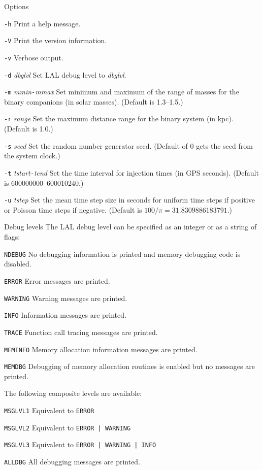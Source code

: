 \begin{entry}
\item[Options]\leavevmode
\begin{entry}
\item[\texttt{-h}]
Print a help message.
\item[\texttt{-V}]
Print the version information.
\item[\texttt{-v}]
Verbose output.
\item[\texttt{-d} \textit{dbglvl}]
Set LAL debug level to \textit{dbglvl}.
\item[\texttt{-m} \textit{mmin}\texttt{-}\textit{mmax}]
Set minimum and maximum of the range of masses  for the  binary companions (in
solar masses).  (Default is 1.3--1.5.)
\item[\texttt{-r} \textit{range}]
Set the maximum distance range for the binary system (in kpc).  (Default is
1.0.)
\item[\texttt{-s} \textit{seed}]
Set  the random number generator seed.  (Default of 0 gets the seed from the
system clock.)
\item[\texttt{-t} \textit{tstart}\texttt{-}\textit{tend}]
Set the time interval for injection times  (in  GPS seconds).  (Default is
600000000--600010240.)
\item[\texttt{-u} \textit{tstep}]
Set  the mean time step size in seconds for uniform time steps if positive or
Poisson  time  steps  if negative.   (Default is $100/\pi = 31.8309886183791$.)
\end{entry}

\item[Debug levels]
The LAL debug level can be specified as an integer or as a string of flags:
\begin{entry}
\item[\texttt{NDEBUG}]
No debugging information is printed and memory debugging code is disabled.
\item[\texttt{ERROR}]
Error messages are printed.
\item[\texttt{WARNING}]
Warning messages are printed.
\item[\texttt{INFO}]
Information messages are printed.
\item[\texttt{TRACE}]
Function call tracing messages are printed.
\item[\texttt{MEMINFO}]
Memory  allocation  information messages are printed.
\item[\texttt{MEMDBG}]
Debugging of memory allocation routines is enabled but no messages are printed.
\end{entry}
The following composite levels are available:
\begin{entry}
\item[\texttt{MSGLVL1}]
Equivalent to \verb$ERROR$
\item[\texttt{MSGLVL2}]
Equivalent to \verb$ERROR | WARNING$
\item[\texttt{MSGLVL3}]
Equivalent to \verb$ERROR | WARNING | INFO$
\item[\texttt{ALLDBG}]
All debugging messages are printed.
\end{entry}


\end{entry}
